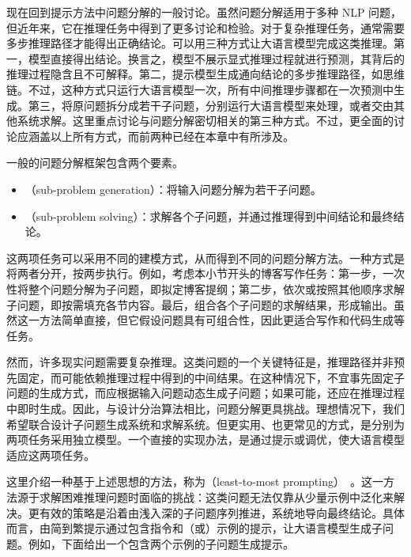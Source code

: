 现在回到提示方法中问题分解的一般讨论。虽然问题分解适用于多种 NLP 问题，但近年来，它在推理任务中得到了更多讨论和检验。对于复杂推理任务，通常需要多步推理路径才能得出正确结论。可以用三种方式让大语言模型完成这类推理。第一，模型直接得出结论。换言之，模型不展示显式推理过程就进行预测，其背后的推理过程隐含且不可解释。第二，提示模型生成通向结论的多步推理路径，如思维链。不过，这种方式只运行大语言模型一次，所有中间推理步骤都在一次预测中生成。第三，将原问题拆分成若干子问题，分别运行大语言模型来处理，或者交由其他系统求解。这里重点讨论与问题分解密切相关的第三种方式。不过，更全面的讨论应涵盖以上所有方式，而前两种已经在本章中有所涉及。

一般的问题分解框架包含两个要素。

\begin{itemize}
\item \vspace{0.5em} （sub-problem generation）：将输入问题分解为若干子问题。
\item \vspace{0.3em} （sub-problem solving）：求解各个子问题，并通过推理得到中间结论和最终结论。
\end{itemize}
\vspace{0.5em}

这两项任务可以采用不同的建模方式，从而得到不同的问题分解方法。一种方式是将两者分开，按两步执行。例如，考虑本小节开头的博客写作任务：第一步，一次性将整个问题分解为子问题，即拟定博客提纲；第二步，依次或按照其他顺序求解子问题，即按需填充各节内容。最后，组合各个子问题的求解结果，形成输出。虽然这一方法简单直接，但它假设问题具有可组合性，因此更适合写作和代码生成等任务。

然而，许多现实问题需要复杂推理。这类问题的一个关键特征是，推理路径并非预先固定，而可能依赖推理过程中得到的中间结果。在这种情况下，不宜事先固定子问题的生成方式，而应根据输入问题动态生成子问题；如果可能，还应在推理过程中即时生成。因此，与设计分治算法相比，问题分解更具挑战。理想情况下，我们希望联合设计子问题生成系统和求解系统。但更实用、也更常见的方式，是分别为两项任务采用独立模型。一个直接的实现办法，是通过提示或调优，使大语言模型适应这两项任务。

这里介绍一种基于上述思想的方法，称为（least-to-most prompting）~\cite{zhou-etal:least}。这一方法源于求解困难推理问题时面临的挑战：这类问题无法仅靠从少量示例中泛化来解决。更有效的策略是沿着由浅入深的子问题序列推进，系统地导向最终结论。具体而言，由简到繁提示通过包含指令和（或）示例的提示，让大语言模型生成子问题。例如，下面给出一个包含两个示例的子问题生成提示。

